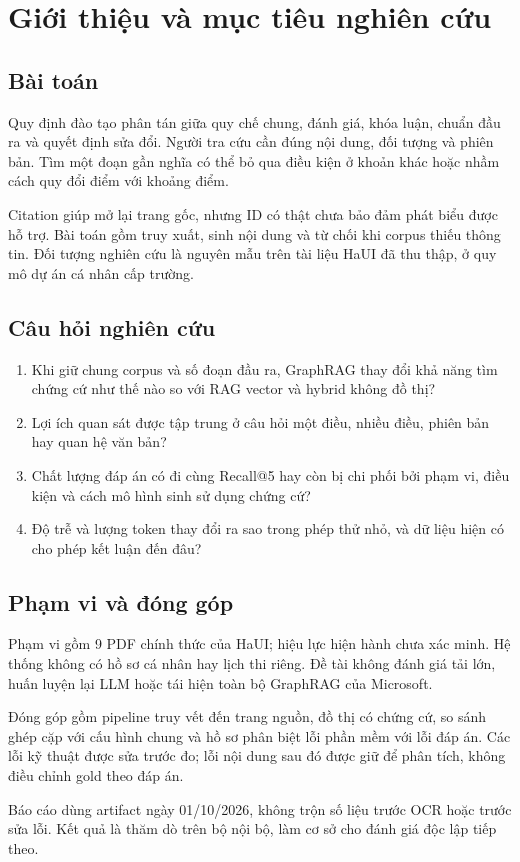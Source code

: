 \section{Giới thiệu và mục tiêu nghiên cứu}
\subsection{Bài toán}
Quy định đào tạo phân tán giữa quy chế chung, đánh giá, khóa luận, chuẩn đầu ra và quyết định sửa đổi. Người tra cứu cần đúng nội dung, đối tượng và phiên bản. Tìm một đoạn gần nghĩa có thể bỏ qua điều kiện ở khoản khác hoặc nhầm cách quy đổi điểm với khoảng điểm.

Citation giúp mở lại trang gốc, nhưng ID có thật chưa bảo đảm phát biểu được hỗ trợ. Bài toán gồm truy xuất, sinh nội dung và từ chối khi corpus thiếu thông tin. Đối tượng nghiên cứu là nguyên mẫu trên tài liệu HaUI đã thu thập, ở quy mô dự án cá nhân cấp trường.

\subsection{Câu hỏi nghiên cứu}
\begin{enumerate}
\item Khi giữ chung corpus và số đoạn đầu ra, GraphRAG thay đổi khả năng tìm chứng cứ như thế nào so với RAG vector và hybrid không đồ thị?
\item Lợi ích quan sát được tập trung ở câu hỏi một điều, nhiều điều, phiên bản hay quan hệ văn bản?
\item Chất lượng đáp án có đi cùng Recall@5 hay còn bị chi phối bởi phạm vi, điều kiện và cách mô hình sinh sử dụng chứng cứ?
\item Độ trễ và lượng token thay đổi ra sao trong phép thử nhỏ, và dữ liệu hiện có cho phép kết luận đến đâu?
\end{enumerate}

\subsection{Phạm vi và đóng góp}
Phạm vi gồm 9 PDF chính thức của HaUI; hiệu lực hiện hành chưa xác minh. Hệ thống không có hồ sơ cá nhân hay lịch thi riêng. Đề tài không đánh giá tải lớn, huấn luyện lại LLM hoặc tái hiện toàn bộ GraphRAG của Microsoft.

Đóng góp gồm pipeline truy vết đến trang nguồn, đồ thị có chứng cứ, so sánh ghép cặp với cấu hình chung và hồ sơ phân biệt lỗi phần mềm với lỗi đáp án. Các lỗi kỹ thuật được sửa trước đo; lỗi nội dung sau đó được giữ để phân tích, không điều chỉnh gold theo đáp án.

Báo cáo dùng artifact ngày 01/10/2026, không trộn số liệu trước OCR hoặc trước sửa lỗi. Kết quả là thăm dò trên bộ nội bộ, làm cơ sở cho đánh giá độc lập tiếp theo.
